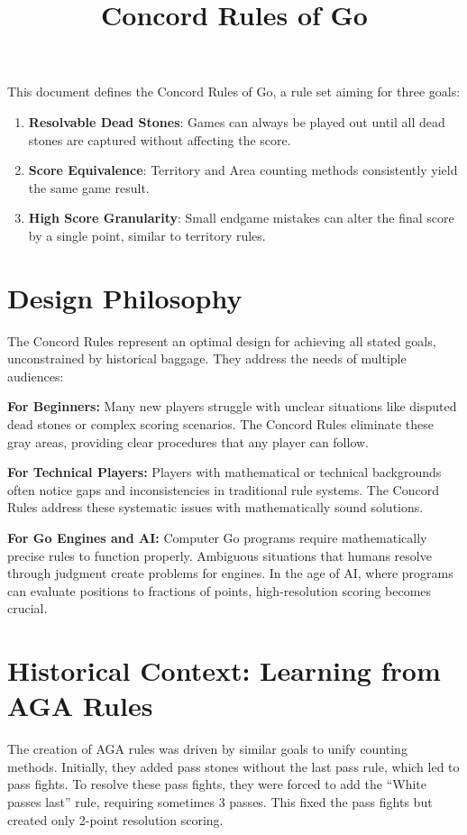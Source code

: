 \documentclass[11pt]{article}
\title{Concord Rules of Go}
\author{}
\date{}
\begin{document}
\maketitle

This document defines the Concord Rules of Go, a rule set aiming for three goals:

\begin{enumerate}
\item \textbf{Resolvable Dead Stones}: Games can always be played out until all dead stones are captured without affecting the score.
\item \textbf{Score Equivalence}: Territory and Area counting methods consistently yield the same game result.
\item \textbf{High Score Granularity}: Small endgame mistakes can alter the final score by a single point, similar to territory rules.
\end{enumerate}

\section{Design Philosophy}

The Concord Rules represent an optimal design for achieving all stated goals, unconstrained by historical baggage. They address the needs of multiple audiences:

\textbf{For Beginners:} Many new players struggle with unclear situations like disputed dead stones or complex scoring scenarios. The Concord Rules eliminate these gray areas, providing clear procedures that any player can follow.

\textbf{For Technical Players:} Players with mathematical or technical backgrounds often notice gaps and inconsistencies in traditional rule systems. The Concord Rules address these systematic issues with mathematically sound solutions.

\textbf{For Go Engines and AI:} Computer Go programs require mathematically precise rules to function properly. Ambiguous situations that humans resolve through judgment create problems for engines. In the age of AI, where programs can evaluate positions to fractions of points, high-resolution scoring becomes crucial.

\section{Historical Context: Learning from AGA Rules}

The creation of AGA rules was driven by similar goals to unify counting methods. Initially, they added pass stones without the last pass rule, which led to pass fights. To resolve these pass fights, they were forced to add the ``White passes last'' rule, requiring sometimes 3 passes. This fixed the pass fights but created only 2-point resolution scoring.
\end{document}
